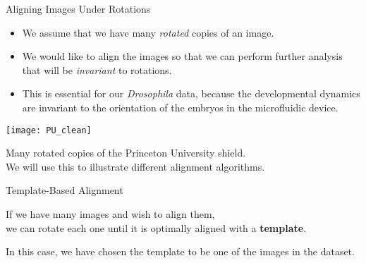 %

\begin{frame}{Aligning Images Under Rotations}
	
	\begin{itemize}
	\item We assume that we have many {\em rotated} copies of an image.
	\item We would like to align the images so that we can perform further analysis that will be {\em invariant} to rotations. 
	\item This is essential for our {\em Drosophila} data, because the developmental dynamics are invariant to the orientation of the embryos in the microfluidic device.
	\end{itemize}

	\centering
	\texttt{[image: PU\_clean]}\\
	{\scriptsize Many rotated copies of the Princeton University shield. \\ We will use this to illustrate different alignment algorithms. \par}	

\end{frame}

\begin{frame}{Template-Based Alignment}
	\centering	
	
	If we have many images and wish to align them, \\ we can rotate each one until it is optimally aligned with a {\bf template}.

	In this case, we have chosen the template to be one of the images in the dataset.

		
\end{frame}

